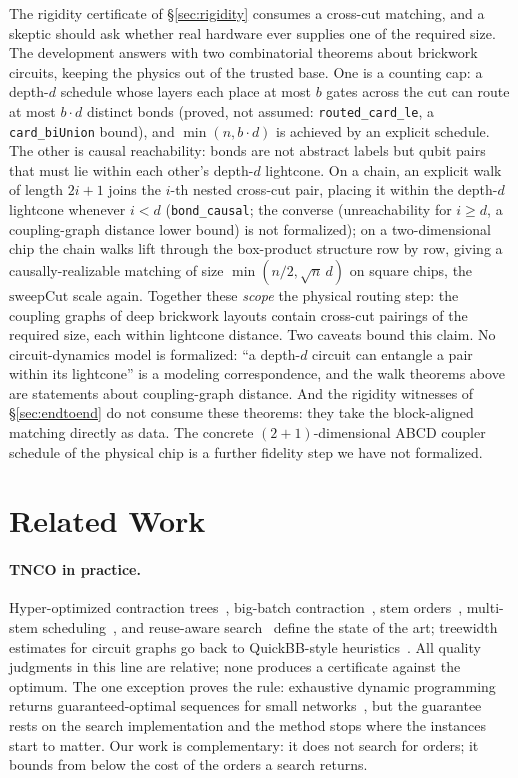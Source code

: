 \documentclass[sigplan,10pt,screen,review,anonymous]{acmart}
\begin{document}
The rigidity certificate of \S\ref{sec:rigidity} consumes a cross-cut matching, and a
skeptic should ask whether real hardware ever supplies one of the required size. The
development answers with two combinatorial theorems about brickwork circuits, keeping the
physics out of the trusted base. One is a counting cap: a depth-$d$ schedule whose layers
each place at most $b$ gates across the cut can route at most $b\cdot d$ distinct bonds
(proved, not assumed: \lstinline|routed_card_le|, a \lstinline|card_biUnion| bound), and
$\min(n, b\cdot d)$ is achieved by an explicit schedule. The other is causal reachability: bonds
are not abstract labels but qubit pairs that must lie within each other's depth-$d$
lightcone. On a chain, an explicit walk of length $2i+1$ joins the $i$-th nested cross-cut
pair, placing it within the depth-$d$ lightcone whenever $i < d$ (\lstinline|bond_causal|;
the converse (unreachability for $i \ge d$, a coupling-graph distance lower bound) is
not formalized); on a
two-dimensional chip the chain walks lift through the box-product structure row by row,
giving a causally-realizable matching of size $\min(n/2, \sqrt{n}\,d)$ on square chips,
the $\mathrm{sweepCut}$ scale again. Together these \emph{scope} the physical routing step:
the coupling graphs of deep brickwork layouts contain cross-cut pairings of the required
size, each within lightcone distance. Two caveats bound this claim. No
circuit-dynamics model is formalized: ``a depth-$d$ circuit can entangle a pair within
its lightcone'' is a modeling correspondence, and the walk theorems above are statements
about coupling-graph distance. And the rigidity witnesses of \S\ref{sec:endtoend} do
not consume these theorems: they take the block-aligned matching directly as data. The
concrete $(2{+}1)$-dimensional ABCD coupler schedule of the physical chip is a further
fidelity step we have not formalized.

\section{Related Work}\label{sec:related}

\paragraph{TNCO in practice.} Hyper-optimized contraction trees~\cite{gray2021hyper},
big-batch contraction~\cite{pan2022solving}, stem orders~\cite{huang2020classical},
multi-stem scheduling~\cite{swtnc2025}, and reuse-aware search~\cite{kalachev2021recursive}
define the state of the art; treewidth estimates for circuit graphs go back to
QuickBB-style heuristics~\cite{boixo2017simulation}. All quality judgments in this line are
relative; none produces a certificate against the optimum. The one exception proves the
rule: exhaustive dynamic programming returns guaranteed-optimal sequences for small
networks~\cite{pfeifer2014faster}, but the guarantee rests on the search implementation and
the method stops where the instances start to matter. Our work is complementary: it
does not search for orders; it bounds from below the cost of the orders a search returns.
\end{document}

